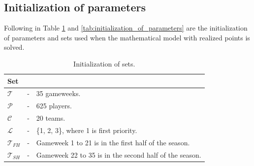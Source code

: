 \subsection{Initialization of parameters}    

Following in Table \ref{tab:initializations_of_sets} and \ref{tab:initialization_of_parameters} are the initialization of parameters and sets used when the mathematical model with realized points is solved. 

\begin{table}[H]
\centering

\begin{tabular}{@{}lll@{}}
\toprule
Set           &   &                                                               \\ \midrule
$\mathcal{T}$ & - & 35 gameweeks.                                             \\
$\mathcal{P}$ & - & 625 players.                                              \\
$\mathcal{C}$ & - & 20 teams.                                                 \\
$\mathcal{L}$ & - & \{1, 2, 3\}, where 1 is first priority. \\
$\mathcal{T}_{FH}$ & - & Gameweek 1 to 21 is in the first half of the season. \\
$\mathcal{T}_{SH}$ & - & Gameweek 22 to 35 is in the second half of the season. \\
\bottomrule
\end{tabular}
\caption{Initialization of sets.}
\label{tab:initializations_of_sets}
\end{table}

